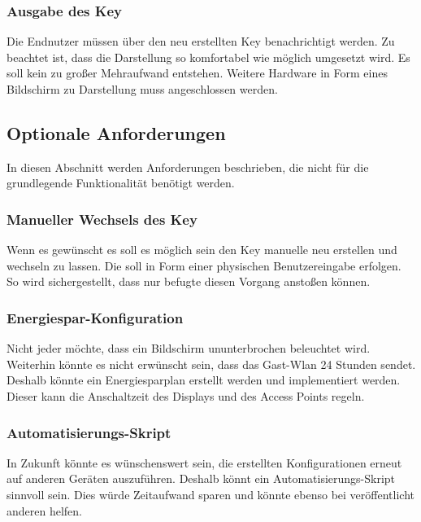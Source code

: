 \documentclass[a4paper,11pt,singlespacing]{article}
\begin{document}
    			\subsubsection{Ausgabe des Key}
		            Die Endnutzer müssen über den neu erstellten Key benachrichtigt werden. Zu beachtet ist, dass die Darstellung so komfortabel wie möglich umgesetzt wird. Es soll kein zu großer Mehraufwand entstehen. Weitere Hardware in Form eines Bildschirm zu Darstellung muss angeschlossen werden.
		           
		            
			\subsection{Optionale Anforderungen}
			    In diesen Abschnitt werden Anforderungen beschrieben, die nicht für die grundlegende Funktionalität benötigt werden.
                \subsubsection{Manueller Wechsels des Key}
                    Wenn es gewünscht es soll es möglich sein den Key manuelle neu erstellen und wechseln zu lassen. Die soll in Form einer physischen Benutzereingabe erfolgen. So wird sichergestellt, dass nur befugte diesen Vorgang anstoßen können. 
                \subsubsection{Energiespar-Konfiguration}
                    Nicht jeder möchte, dass ein Bildschirm ununterbrochen beleuchtet wird. Weiterhin könnte es nicht erwünscht sein, dass das Gast-Wlan 24 Stunden sendet. Deshalb könnte ein Energiesparplan erstellt werden und implementiert werden. Dieser kann die Anschaltzeit des Displays und des Access Points regeln. 
                \subsubsection{Automatisierungs-Skript}
                    In Zukunft könnte es wünschenswert sein, die erstellten Konfigurationen erneut auf anderen Geräten auszuführen. Deshalb könnt ein Automatisierungs-Skript sinnvoll sein. Dies würde Zeitaufwand sparen und könnte ebenso bei veröffentlicht anderen helfen.  
\end{document}

